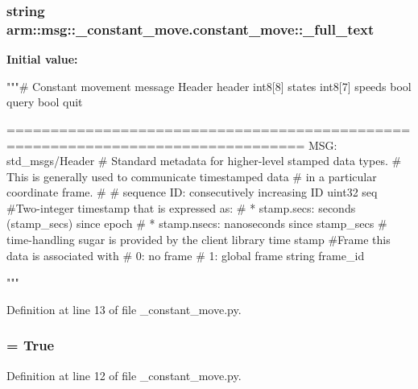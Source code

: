 \subsubsection[{\-\_\-full\-\_\-text}]{\setlength{\rightskip}{0pt plus 5cm}string {\bf arm\-::msg\-::\-\_\-constant\-\_\-move.\-constant\-\_\-move\-::\-\_\-full\-\_\-text}\hspace{0.3cm}{\ttfamily  [static, private]}}\label{classarm_1_1msg_1_1__constant__move_1_1constant__move_a608a5ce9d00276c882fdc43e4d50ebc4}
{\bfseries \-Initial value\-:}
\begin{DoxyCode}
"""# Constant movement message
Header header
int8[8] states
int8[7] speeds
bool query
bool quit

      ================================================================================
MSG: std_msgs/Header
# Standard metadata for higher-level stamped data types.
# This is generally used to communicate timestamped data 
# in a particular coordinate frame.
# 
# sequence ID: consecutively increasing ID 
uint32 seq
#Two-integer timestamp that is expressed as:
# * stamp.secs: seconds (stamp_secs) since epoch
# * stamp.nsecs: nanoseconds since stamp_secs
# time-handling sugar is provided by the client library
time stamp
#Frame this data is associated with
# 0: no frame
# 1: global frame
string frame_id

"""
\end{DoxyCode}


\-Definition at line 13 of file \-\_\-constant\-\_\-move.\-py.

\subsubsection[{\-\_\-has\-\_\-header}]{ = \-True\hspace{0.3cm}{\ttfamily  [static, private]}}\label{classarm_1_1msg_1_1__constant__move_1_1constant__move_a3ba1a43dba2f9e3e11a35b63d356d581}


\-Definition at line 12 of file \-\_\-constant\-\_\-move.\-py.

